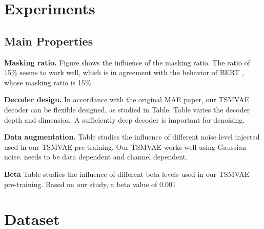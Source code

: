 \documentclass[12pt]{article} %
\begin{document}

\section{Experiments}

\subsection{Main Properties}

\textbf{Masking ratio.} Figure shows the influence of the masking ratio. The ratio of 15\% seems to work well, which is in agreement with the behavior of BERT \citep{devlin2019bert}, whose masking ratio is 15\%. 

\textbf{Decoder design.} In accordance with the original MAE paper, our TSMVAE decoder can be flexible designed, as studied in Table. Table varies the decoder depth and dimension. A sufficiently deep decoder is important for denoising.

\textbf{Data augmentation.} Table studies the influence of different noise level injected used in our TSMVAE pre-training. Our TSMVAE works well using Gaussian noise.  needs to be data dependent and channel dependent.

\textbf{Beta} Table studies the influence of different beta levels used in our TSMVAE pre-training. Based on our study, a beta value of 0.001 

\newpage
\section{Dataset}
\end{document}
